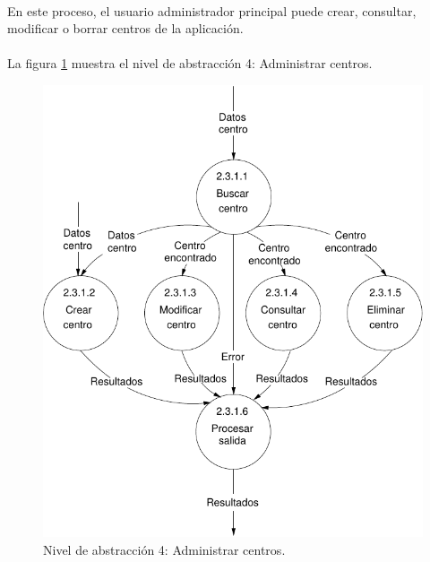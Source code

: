 \paragraph{}En este proceso, el usuario administrador principal puede crear,
consultar, modificar o borrar centros de la aplicación.

\paragraph{}La figura \ref{diagramaNivel4-AdministrarCentros}
muestra el nivel de abstracción 4: Administrar centros.

  \begin{figure}[!ht]
    \begin{center}
      \includegraphics[]{08.Analisis_Funcional/8.2.DFDs/Niveles/Nivel4/AdministradorPrincipal/AdministrarCentros/Diagramas/nivel4-AdministrarCentros.pdf}
      \caption{Nivel de abstracción 4: Administrar centros.}
      \label{diagramaNivel4-AdministrarCentros}
    \end{center}
  \end{figure}
